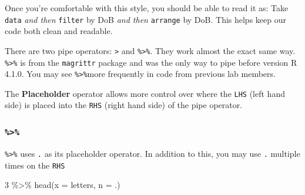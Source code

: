 \documentclass[
  letterpaper,
  DIV=11,
  numbers=noendperiod]{scrreprt}
\newenvironment{Shaded}{\begin{snugshade}}{\end{snugshade}}
\newcommand{\AttributeTok}[1]{\textcolor[rgb]{0.40,0.45,0.13}{#1}}
\newcommand{\DecValTok}[1]{\textcolor[rgb]{0.68,0.00,0.00}{#1}}
\newcommand{\FunctionTok}[1]{\textcolor[rgb]{0.28,0.35,0.67}{#1}}
\newcommand{\NormalTok}[1]{\textcolor[rgb]{0.00,0.23,0.31}{#1}}
\newcommand{\SpecialCharTok}[1]{\textcolor[rgb]{0.37,0.37,0.37}{#1}}
\begin{document}
Once you're comfortable with this style, you should be able to read it
as: Take \texttt{data} \emph{and then} \texttt{filter} by DoB \emph{and
then} \texttt{arrange} by DoB. This helps keep our code both clean and
readable.

\begin{tcolorbox}[enhanced jigsaw, left=2mm, colframe=quarto-callout-tip-color-frame, leftrule=.75mm, opacitybacktitle=0.6, toptitle=1mm, title=\textcolor{quarto-callout-tip-color}{\faLightbulb}\hspace{0.5em}{Tip}, opacityback=0, coltitle=black, colbacktitle=quarto-callout-tip-color!10!white, breakable, colback=white, titlerule=0mm, bottomrule=.15mm, arc=.35mm, bottomtitle=1mm, rightrule=.15mm, toprule=.15mm]

There are two pipe operators: \texttt{\textbar{}\textgreater{}} and
\texttt{\%\textgreater{}\%}. They work almost the exact same way.
\texttt{\%\textgreater{}\%} is from the \texttt{magrittr} package and
was the only way to pipe before version R 4.1.0. You may see
\texttt{\%\textgreater{}\%}more frequently in code from previous lab
members.

\begin{tcolorbox}[enhanced jigsaw, left=2mm, colframe=quarto-callout-note-color-frame, leftrule=.75mm, opacitybacktitle=0.6, toptitle=1mm, title=\textcolor{quarto-callout-note-color}{\faInfo}\hspace{0.5em}{Note}, opacityback=0, coltitle=black, colbacktitle=quarto-callout-note-color!10!white, breakable, colback=white, titlerule=0mm, bottomrule=.15mm, arc=.35mm, bottomtitle=1mm, rightrule=.15mm, toprule=.15mm]

The \textbf{Placeholder} operator allows more control over where the
\texttt{LHS} (left hand side) is placed into the \texttt{RHS} (right
hand side) of the pipe operator.

\hypertarget{section}{%
\subsubsection{\texorpdfstring{\texttt{\%\textgreater{}\%}}{\%\textgreater\%}}\label{section}}

\texttt{\%\textgreater{}\%} uses \texttt{.} as its placeholder operator.
In addition to this, you may use \texttt{.} multiple times on the
\texttt{RHS}

\begin{Shaded}
\begin{Highlighting}[]
\DecValTok{3} \SpecialCharTok{\%\textgreater{}\%} \FunctionTok{head}\NormalTok{(}\AttributeTok{x =}\NormalTok{ letters, }\AttributeTok{n =}\NormalTok{ .)}
\end{Highlighting}
\end{Shaded}


\end{tcolorbox}
\end{tcolorbox}
\end{document}
